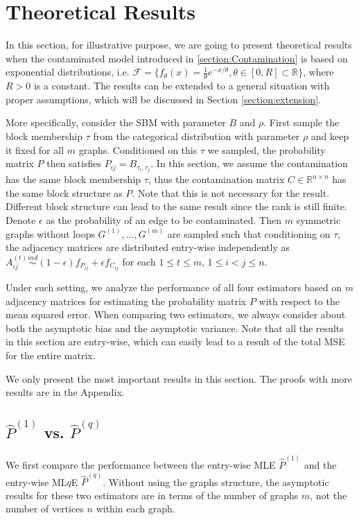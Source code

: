 \documentclass[a4paper]{article}
\renewcommand{\hat}{\widehat}
\begin{document}
\section{Theoretical Results}
\label{section:theory}
In this section, for illustrative purpose, we are going to present theoretical results when the contaminated model introduced in \ref{section:Contamination} is based on exponential distributions, i.e. $\mathcal{F} = \{ f_{\theta}(x) = \frac{1}{\theta} e^{-x/\theta}, \theta \in [0, R] \subset \mathbb{R} \}$, where $R > 0$ is a constant. The results can be extended to a general situation with proper assumptions, which will be discussed in Section \ref{section:extension}.

More specifically, consider the SBM with parameter $B$ and $\rho$. First sample the block membership $\tau$ from the categorical distribution with parameter $\rho$ and keep it fixed for all $m$ graphs. Conditioned on this $\tau$ we sampled, the probability matrix $P$ then satisfies $P_{ij} = B_{\tau_i, \tau_j}$. In this section, we assume the contamination has the same block membership $\tau$, thus the contamination matrix $C \in \mathbb{R}^{n \times n}$ has the same block structure as $P$. Note that this is not necessary for the result. Different block structure can lead to the same result since the rank is still finite. Denote $\epsilon$ as the probability of an edge to be contaminated. Then $m$ symmetric graphs without loops $G^{(1)}, \dotsc, G^{(m)}$  are sampled such that conditioning on $\tau$, the adjacency matrices are distributed entry-wise independently as $A^{(t)}_{ij} \stackrel{ind}{\sim} (1-\epsilon) f_{P_{ij}} + \epsilon f_{C_{ij}}$ for each $1 \le t \le m$, $1 \le i < j \le n$. 

Under such setting, we analyze the performance of all four estimators based on $m$ adjacency matrices for estimating the probability matrix $P$ with respect to the mean squared error. When comparing two estimators, we always consider about both the asymptotic bias and the asymptotic variance. Note that all the results in this section are entry-wise, which can easily lead to a result of the total MSE for the entire matrix.

We only present the most important results in this section. The proofs with more results are in the Appendix.

\subsection{$\hat{P}^{(1)}$ vs. $\hat{P}^{(q)}$}
\label{section:MLEvsMLqE}
We first compare the performance between the entry-wise MLE $\hat{P}^{(1)}$ and the entry-wise ML$q$E $\hat{P}^{(q)}$. Without using the graphs structure, the asymptotic results for these two estimators are in terms of the number of graphs $m$, not the number of vertices $n$ within each graph.
\end{document}
